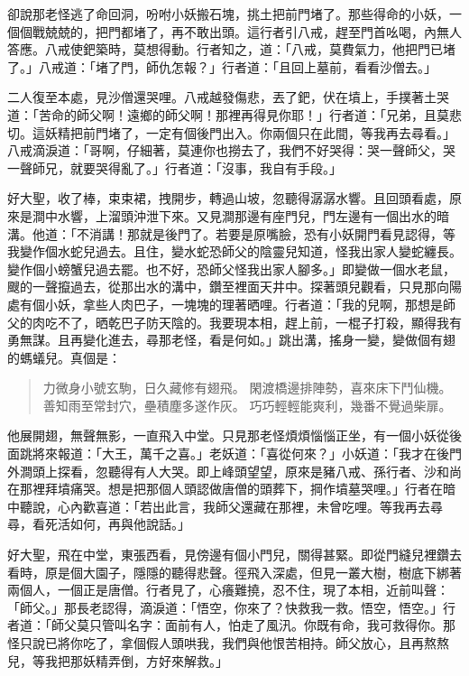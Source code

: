 卻說那老怪逃了命回洞，吩咐小妖搬石塊，挑土把前門堵了。那些得命的小妖，一個個戰兢兢的，把門都堵了，再不敢出頭。這行者引八戒，趕至門首吆喝，內無人答應。八戒使鈀築時，莫想得動。行者知之，道：「八戒，莫費氣力，他把門已堵了。」八戒道：「堵了門，師仇怎報？」行者道：「且回上墓前，看看沙僧去。」

二人復至本處，見沙僧還哭哩。八戒越發傷悲，丟了鈀，伏在墳上，手撲著土哭道：「苦命的師父啊！遠鄉的師父啊！那裡再得見你耶！」行者道：「兄弟，且莫悲切。這妖精把前門堵了，一定有個後門出入。你兩個只在此間，等我再去尋看。」八戒滴淚道：「哥啊，仔細著，莫連你也撈去了，我們不好哭得：哭一聲師父，哭一聲師兄，就要哭得亂了。」行者道：「沒事，我自有手段。」

好大聖，收了棒，束束裙，拽開步，轉過山坡，忽聽得潺潺水響。且回頭看處，原來是澗中水響，上溜頭沖泄下來。又見澗那邊有座門兒，門左邊有一個出水的暗溝。他道：「不消講！那就是後門了。若要是原嘴臉，恐有小妖開門看見認得，等我變作個水蛇兒過去。且住，變水蛇恐師父的陰靈兒知道，怪我出家人變蛇纏長。變作個小螃蟹兒過去罷。也不好，恐師父怪我出家人腳多。」即變做一個水老鼠，颼的一聲攛過去，從那出水的溝中，鑽至裡面天井中。探著頭兒觀看，只見那向陽處有個小妖，拿些人肉巴子，一塊塊的理著晒哩。行者道：「我的兒啊，那想是師父的肉吃不了，晒乾巴子防天陰的。我要現本相，趕上前，一棍子打殺，顯得我有勇無謀。且再變化進去，尋那老怪，看是何如。」跳出溝，搖身一變，變做個有翅的螞蟻兒。真個是：
\begin{quote}
力微身小號玄駒，日久藏修有翅飛。
閑渡橋邊排陣勢，喜來床下鬥仙機。
善知雨至常封穴，壘積塵多遂作灰。
巧巧輕輕能爽利，幾番不覺過柴扉。
\end{quote}

他展開翅，無聲無影，一直飛入中堂。只見那老怪煩煩惱惱正坐，有一個小妖從後面跳將來報道：「大王，萬千之喜。」老妖道：「喜從何來？」小妖道：「我才在後門外澗頭上探看，忽聽得有人大哭。即上峰頭望望，原來是豬八戒、孫行者、沙和尚在那裡拜墳痛哭。想是把那個人頭認做唐僧的頭葬下，掆作墳墓哭哩。」行者在暗中聽說，心內歡喜道：「若出此言，我師父還藏在那裡，未曾吃哩。等我再去尋尋，看死活如何，再與他說話。」

好大聖，飛在中堂，東張西看，見傍邊有個小門兒，關得甚緊。即從門縫兒裡鑽去看時，原是個大園子，隱隱的聽得悲聲。徑飛入深處，但見一叢大樹，樹底下綁著兩個人，一個正是唐僧。行者見了，心癢難撓，忍不住，現了本相，近前叫聲：「師父。」那長老認得，滴淚道：「悟空，你來了？快救我一救。悟空，悟空。」行者道：「師父莫只管叫名字：面前有人，怕走了風汛。你既有命，我可救得你。那怪只說已將你吃了，拿個假人頭哄我，我們與他恨苦相持。師父放心，且再熬熬兒，等我把那妖精弄倒，方好來解救。」

